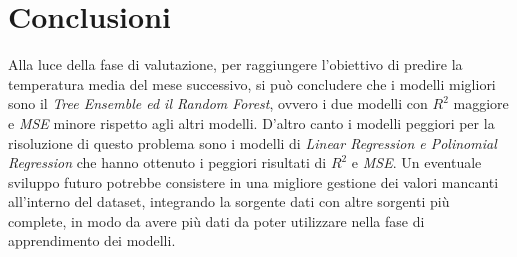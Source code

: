 \documentclass[12pt, a4paper, twocolumn]{article} %
\begin{document}
\section{Conclusioni}
Alla luce della fase di valutazione, per raggiungere l'obiettivo di predire la temperatura media del mese successivo, si può concludere che i modelli migliori sono il \textit{Tree Ensemble ed il Random Forest}, ovvero i due modelli con $R^{2}$ maggiore e \textit{MSE} minore rispetto agli altri modelli. D'altro canto i modelli peggiori per la risoluzione di questo problema sono i modelli di \textit{Linear Regression e Polinomial Regression} che hanno ottenuto i peggiori risultati di $R^{2}$ e \textit{MSE}. Un eventuale sviluppo futuro potrebbe consistere in una migliore gestione dei valori mancanti all'interno del dataset, integrando la sorgente dati con altre sorgenti più complete, in modo da avere più dati da poter utilizzare nella fase di apprendimento dei modelli.

\printbibliography %
\end{document}
